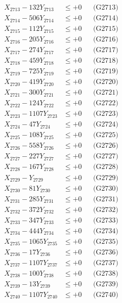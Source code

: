 \documentclass[a4paper,10pt]{article}
\begin{document}
{\begin{align}
X_{2713} - 132Y_{2713} &\leq +0 && \text{(G2713)} \\
X_{2714} - 506Y_{2714} &\leq +0 && \text{(G2714)} \\
X_{2715} - 112Y_{2715} &\leq +0 && \text{(G2715)} \\
X_{2716} - 205Y_{2716} &\leq +0 && \text{(G2716)} \\
X_{2717} - 274Y_{2717} &\leq +0 && \text{(G2717)} \\
X_{2718} - 459Y_{2718} &\leq +0 && \text{(G2718)} \\
X_{2719} - 725Y_{2719} &\leq +0 && \text{(G2719)} \\
X_{2720} - 419Y_{2720} &\leq +0 && \text{(G2720)} \\
\allowbreak
X_{2721} - 300Y_{2721} &\leq +0 && \text{(G2721)} \\
X_{2722} - 124Y_{2722} &\leq +0 && \text{(G2722)} \\
X_{2723} - 1107Y_{2723} &\leq +0 && \text{(G2723)} \\
X_{2724} - 47Y_{2724} &\leq +0 && \text{(G2724)} \\
X_{2725} - 108Y_{2725} &\leq +0 && \text{(G2725)} \\
X_{2726} - 558Y_{2726} &\leq +0 && \text{(G2726)} \\
X_{2727} - 227Y_{2727} &\leq +0 && \text{(G2727)} \\
X_{2728} - 167Y_{2728} &\leq +0 && \text{(G2728)} \\
X_{2729} - Y_{2729} &\leq +0 && \text{(G2729)} \\
X_{2730} - 81Y_{2730} &\leq +0 && \text{(G2730)} \\
\allowbreak
X_{2731} - 285Y_{2731} &\leq +0 && \text{(G2731)} \\
X_{2732} - 372Y_{2732} &\leq +0 && \text{(G2732)} \\
X_{2733} - 347Y_{2733} &\leq +0 && \text{(G2733)} \\
X_{2734} - 444Y_{2734} &\leq +0 && \text{(G2734)} \\
X_{2735} - 1065Y_{2735} &\leq +0 && \text{(G2735)} \\
X_{2736} - 17Y_{2736} &\leq +0 && \text{(G2736)} \\
X_{2737} - 1107Y_{2737} &\leq +0 && \text{(G2737)} \\
X_{2738} - 100Y_{2738} &\leq +0 && \text{(G2738)} \\
X_{2739} - 13Y_{2739} &\leq +0 && \text{(G2739)} \\
X_{2740} - 1107Y_{2740} &\leq +0 && \text{(G2740)} \\

\end{align}}
\end{document}
